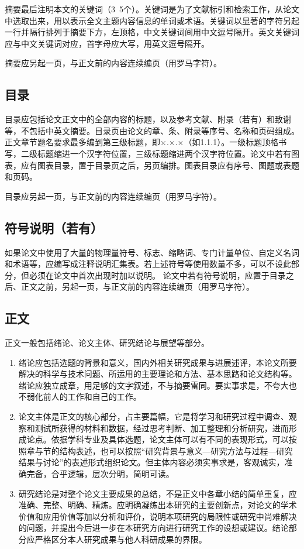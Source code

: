 摘要最后注明本文的关键词（3~5个）。关键词是为了文献标引和检索工作，从论文中选取出来，用以表示全文主题内容信息的单词或术语。关键词以显著的字符另起一行并隔行排列于摘要下方，左顶格，中文关键词间用中文逗号隔开。英文关键词应与中文关键词对应，首字母应大写，用英文逗号隔开。

摘要应另起一页，与正文前的内容连续编页（用罗马字符）。
\subsection{目录}
目录应包括论文正文中的全部内容的标题，以及参考文献、附录（若有）和致谢等，不包括中英文摘要。目录页由论文的章、条、附录等序号、名称和页码组成。正文章节题名要求最多编到第三级标题，即×.×.×（如1.1.1）。一级标题顶格书写，二级标题缩进一个汉字符位置，三级标题缩进两个汉字符位置。论文中若有图表，应有图表目录，置于目录页之后，另页编排。图表目录应有序号、图题或表题和页码。

目录应另起一页，与正文前的内容连续编页（用罗马字符）。
\subsection{符号说明（若有）}
如果论文中使用了大量的物理量符号、标志、缩略词、专门计量单位、自定义名词和术语等，应编写成注释说明汇集表。若上述符号等使用数量不多，可以不设此部分，但必须在论文中首次出现时加以说明。
论文中若有符号说明，应置于目录之后、正文之前，另起一页，与正文前的内容连续编页（用罗马字符）。
\subsection{正文}
正文一般包括绪论、论文主体、研究结论与展望等部分。

\begin{enumerate}
    \item 绪论应包括选题的背景和意义，国内外相关研究成果与进展述评，本论文所要解决的科学与技术问题、所运用的主要理论和方法、基本思路和论文结构等。绪论应独立成章，用足够的文字叙述，不与摘要雷同。要实事求是，不夸大也不弱化前人的工作和自己的工作。
    \item 论文主体是正文的核心部分，占主要篇幅，它是将学习和研究过程中调查、观察和测试所获得的材料和数据，经过思考判断、加工整理和分析研究，进而形成论点。依据学科专业及具体选题，论文主体可以有不同的表现形式，可以按照章与节的结构表述，也可以按照“研究背景与意义—研究方法与过程—研究结果与讨论”的表述形式组织论文。但主体内容必须实事求是，客观诚实，准确完备，合乎逻辑，层次分明，简明可读。
    \item 研究结论是对整个论文主要成果的总结，不是正文中各章小结的简单重复，应准确、完整、明确、精炼。应明确凝练出本研究的主要创新点，对论文的学术价值和应用价值等加以分析和评价，说明本项研究的局限性或研究中尚难解决的问题，并提出今后进一步在本研究方向进行研究工作的设想或建议。结论部分应严格区分本人研究成果与他人科研成果的界限。
\end{enumerate}
